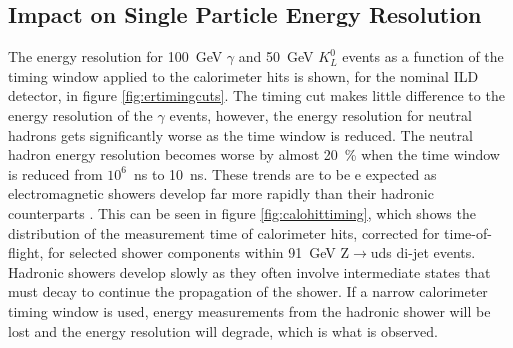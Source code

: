 
\subsection{Impact on Single Particle Energy Resolution}
The energy resolution for 100~GeV $\gamma$ and 50~GeV $K^{0}_{L}$ events as a function of the timing window applied to the calorimeter hits is shown, for the nominal ILD detector, in figure \ref{fig:ertimingcuts}.  The timing cut makes little difference to the energy resolution of the $\gamma$ events, however, the energy resolution for neutral hadrons gets significantly worse as the time window is reduced.  The neutral hadron energy resolution becomes worse by almost 20~\% when the time window is reduced from $10^{6}$~ns to 10~ns.  These trends are to be e expected as electromagnetic showers develop far more rapidly than their hadronic counterparts \cite{Wigmans:2000vf}.  This can be seen in figure \ref{fig:calohittiming}, which shows the distribution of the measurement time of calorimeter hits, corrected for time-of-flight, for selected shower components within 91~GeV Z$\rightarrow$uds di-jet events.  Hadronic showers develop slowly as they often involve intermediate states that must decay to continue the propagation of the shower.  If a narrow calorimeter timing window is used, energy measurements from the hadronic shower will be lost and the energy resolution will degrade, which is what is observed.  

